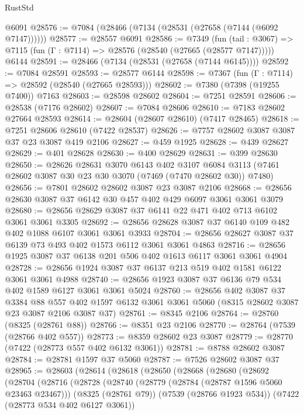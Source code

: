 \begin{lexlean}{RustStd}
\begin{coremodule}
    @6091
@28576 := @7084 (@28466 (@7134 (@28531 (@27658 (@7144 (@6092 @7147))))))
@28577 := @28557 @6091
@28586 := @7349
    (fun (tail : @3067) => @7115 (fun (Γ : @7114) => @28576 (@28540 (@27665 (@28577 @7147)))))
    @6144
@28591 := @28466 (@7134 (@28531 (@27658 (@7144 @6145))))
@28592 := @7084 @28591
@28593 := @28577 @6144
@28598 := @7367 (fun (Γ : @7114) => @28592 (@28540 (@27665 @28593)))
@28602 := @7380 (@7398 (@19255 @7400)) @7163
@28603 := @28598 @28602
@28604 := @7251 @28591
@28606 := @28538 (@7176 @28602)
@28607 := @7084 @28606
@28610 := @7183 @28602 @27664 @28593
@28614 := @28604 (@28607 @28610) (@7417 @28465)
@28618 := @7251 @28606 @28610 (@7422 @28537)
@28626 := @7757 @28602 @3087 @3087 @37 @23 @3087 @419 @2106
@28627 := @459 @1925
@28628 := @439 @28627
@28629 := @401 @28628
@28630 := @400 @28629
@28631 := @399 @28630
@28650 := @28626
    @28631
    @3070
    @6143
    @402
    @3107
    @6084
    @3113
    (@7461 @28602 @3087 @30 @23 @30 @3070 (@7469 (@7470 @28602 @30)) @7480)
@28656 := @7801 @28602 @28602 @3087 @23 @3087 @2106
@28668 := @28656 @28630 @3087 @37 @6142 @30 @457 @402 @429 @6097 @3061 @3061 @3079
@28680 := @28656 @28629 @3087 @37 @6141 @22 @471 @402 @713 @6102 @3061 @3061 @3305
@28692 := @28656 @28628 @3087 @37 @6140 @109 @482 @402 @1088 @6107 @3061 @3061 @3933
@28704 := @28656 @28627 @3087 @37 @6139 @73 @493 @402 @1573 @6112 @3061 @3061 @4863
@28716 := @28656 @1925 @3087 @37 @6138 @201 @506 @402 @1613 @6117 @3061 @3061 @4904
@28728 := @28656 @1924 @3087 @37 @6137 @213 @519 @402 @1581 @6122 @3061 @3061 @4988
@28740 := @28656 @1923 @3087 @37 @6136 @79 @534 @402 @1589 @6127 @3061 @3061 @5024
@28760 := @28656
    @402
    @3087
    @37
    @3384
    @88
    @557
    @402
    @1597
    @6132
    @3061
    @3061
    @5060
    (@8315 @28602 @3087 @23 @3087 @2106 @3087 @37)
@28761 := @8345 @2106
@28764 := @28760 (@8325 (@28761 @88))
@28766 := @8351 @23 @2106
@28770 := @28764 (@7539 (@28766 @402 @557))
@28773 := @8359 @28602 @23 @3087
@28779 := @28770 (@7422 (@28773 @557 @402 @6132 @3061))
@28781 := @8788 @28602 @3087
@28784 := @28781 @1597 @37 @5060
@28787 := @7526 @28602 @3087 @37
@28965 := @28603
    (@28614
      (@28618
        (@28650
          (@28668
            (@28680
              (@28692
                (@28704
                  (@28716
                    (@28728
                      (@28740
                        (@28779 (@28784 (@28787 @1596 @5060 @23463 @23467)))
                        (@8325 (@28761 @79))
                        (@7539 (@28766 @1923 @534))
                        (@7422 (@28773 @534 @402 @6127 @3061))

\end{coremodule}
\end{lexlean}
